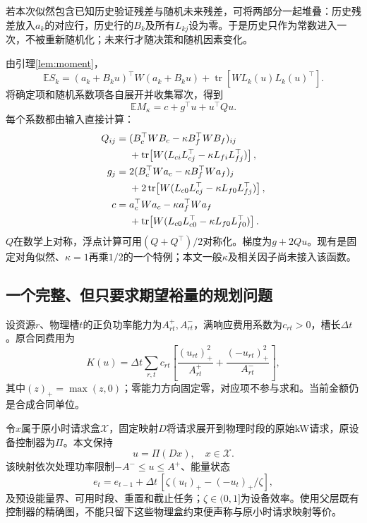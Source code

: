 \documentclass[UTF8,11pt,a4paper,fontset=fandol]{ctexart}
\newcommand{\E}{\mathbb E}
\newcommand{\tr}{\operatorname{tr}}
\newcommand{\code}[1]{\texttt{\detokenize{#1}}}
\numberwithin{equation}{section}
\begin{document}
若本次似然包含已知历史验证残差与随机未来残差，可将两部分一起堆叠：历史残差放入$a_k$的对应行，历史行的$B_k$及所有$L_{kj}$设为零。于是历史只作为常数进入一次，不被重新随机化；未来行才随决策和随机因素变化。

由引理\ref{lem:moment}，
\begin{equation}
\E S_k=(a_k+B_ku)^\top W(a_k+B_ku)
+\tr[WL_k(u)L_k(u)^\top].
\end{equation}
将确定项和随机系数项各自展开并收集幂次，得到
\begin{equation}
\boxed{\E M_\kappa=c+g^\top u+u^\top Qu.}
\label{eq:quadratic}
\end{equation}
每个系数都由输入直接计算：
\begin{align}
Q_{ij}={}&(B_c^\top WB_c-\kappa B_f^\top WB_f)_{ij}\notag\\
&+\tr\!\left[W(L_{ci}L_{cj}^\top-\kappa L_{fi}L_{fj}^\top)\right],\\
g_j={}&2(B_c^\top Wa_c-\kappa B_f^\top Wa_f)_j\notag\\
&+2\tr\!\left[W(L_{c0}L_{cj}^\top-\kappa L_{f0}L_{fj}^\top)\right],\\
c={}&a_c^\top Wa_c-\kappa a_f^\top Wa_f\notag\\
&+\tr\!\left[W(L_{c0}L_{c0}^\top-\kappa L_{f0}L_{f0}^\top)\right].
\label{eq:coefficients}
\end{align}
$Q$在数学上对称，浮点计算可用$(Q+Q^\top)/2$对称化。梯度为$g+2Qu$。现有\code{core.build_expected}是固定对角似然、$\kappa=1$再乘$1/2$的一个特例；本文一般$\kappa$及相关因子尚未接入该函数。

\subsection{一个完整、但只要求期望裕量的规划问题}
设资源$r$、物理槽$t$的正负功率能力为$A^+_{rt},A^-_{rt}$，满响应费用系数为$c_{rt}>0$，槽长$\Delta t$。原合同费用为
\begin{equation}
K(u)=\Delta t\sum_{r,t}c_{rt}
\left[\frac{(u_{rt})_+^2}{A^+_{rt}}+
\frac{(-u_{rt})_+^2}{A^-_{rt}}\right],
\label{eq:cost}
\end{equation}
其中$(z)_+=\max(z,0)$；零能力方向固定零，对应项不参与求和。当前金额仍是合成合同单位。

令$x$属于原小时请求盒$\mathcal X$，固定映射$D$将请求展开到物理时段的原始kW请求，原设备控制器为$\Pi$。本文保持
\begin{equation}
u=\Pi(Dx),\quad x\in\mathcal X.
\end{equation}
该映射依次处理功率限制$-A^-\le u\le A^+$、能量状态
\begin{equation}
e_t=e_{t-1}+\Delta t\,[\zeta(u_t)_+-(-u_t)_+/\zeta],
\end{equation}
及预设能量界、可用时段、重置和截止任务；$\zeta\in(0,1]$为设备效率。使用父层既有控制器的精确图，不能只留下这些物理盒约束便声称与原小时请求映射等价。
\end{document}
